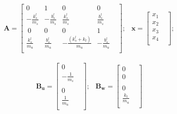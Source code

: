 \documentclass[a4paper]{ifacconf}
\begin{document}
    \begin{equation*} 
    \begin{split}
        \mathbf{A} =
        \begin{bmatrix}
            0 & 1 & 0 & 0 & \\            
            -\frac{k_{s}^{l}}{m_s}&-\frac{b_{s}^{l}}{m_s}&\frac{k_{s}^{l}}{m_s}&\frac{b_{s}^{l}}{m_s} &\\ \  
            0 & 0 & 0 & 1 & \\
            \frac{k_{s}^{l}}{m_u}&\frac{b_{s}^{l}}{m_u}&-\frac{(k_{s}^{l}+k_t)}{m_u}&-\frac{b_{s}^{l}}{m_u} &\\
        \end{bmatrix};
    \end{split}
    \begin{split}
       \mathbf{x} = 
        \begin{bmatrix}
             x_1 &\\
             x_2 &\\
             x_3 &\\
             x_4 &\\
        \end{bmatrix}; 
    \end{split}
    \end{equation*}
    
    \begin{equation} 
    \begin{split}
        \mathbf{B_u} = 
        \begin{bmatrix}
            0 & \\            
            -\frac{1}{m_s}&\\ \\  
            0 & \\
            \frac{1}{m_u}&\\
        \end{bmatrix};
    \end{split}
    \begin{split}
        \mathbf{B_w} = 
        \begin{bmatrix}
            0 & \\            
            0 &\\ \\  
            0 & \\
            \frac{k_t}{m_u}& \\
        \end{bmatrix}
    \end{split}
    \end{equation}
    
\end{document}
